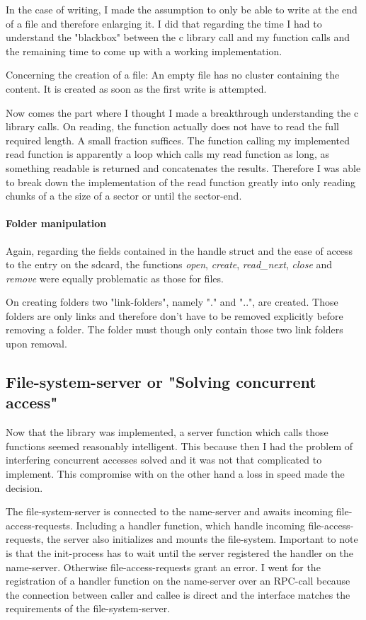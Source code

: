 In the case of writing, I made the assumption to only be able to write at the end of a file and therefore enlarging it. I did that regarding the time I had to understand the "blackbox" between the c library call and my function calls and the remaining time to come up with a working implementation.

Concerning the creation of a file: An empty file has no cluster containing the content. It is created as soon as the first write is attempted. 

Now comes the part where I thought I made a breakthrough understanding the c library calls. On reading, the function actually does not have to read the full required length. A small fraction suffices. The function calling my implemented read function is apparently a loop which calls my read function as long, as something readable is returned and concatenates the results. Therefore I was able to break down the implementation of the read function greatly into only reading chunks of a the size of a sector or until the sector-end.  

\paragraph{Folder manipulation}
Again, regarding the fields contained in the handle struct and the ease of access to the entry on the sdcard, the functions \emph{open}, \emph{create}, \emph{read\_next}, \emph{close} and \emph{remove} were equally problematic as those for files. 

On creating folders two "link-folders", namely "." and "..", are created. Those folders are only links and therefore don't have to be removed explicitly before removing a folder. The folder must though only contain those two link folders upon removal. 

\subsection{File-system-server or "Solving concurrent access"}
Now that the library was implemented, a server function which calls those functions seemed reasonably intelligent. This because then I had the problem of interfering concurrent accesses solved and it was not that complicated to implement. This compromise with on the other hand a loss in speed made the decision. 

The file-system-server is connected to the name-server and awaits incoming file-access-requests. Including a handler function, which handle incoming file-access-requests, the server also initializes and mounts the file-system. Important to note is that the init-process has to wait until the server registered the handler on the name-server. Otherwise file-access-requests grant an error. 
I went for the registration of a handler function on the name-server over an RPC-call because the connection between caller and callee is direct and the interface matches the requirements of the file-system-server.


